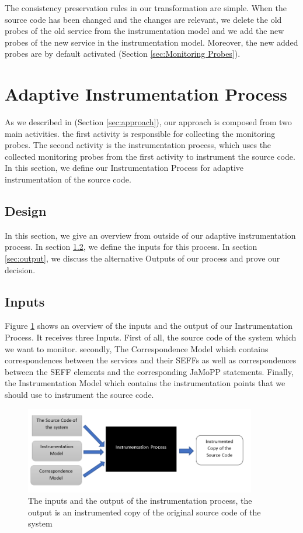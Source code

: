 The consistency preservation rules in our transformation are simple. When the source code has been changed and the changes are relevant, we delete the old probes of the old service from the instrumentation model and we add the new probes of the new service in the instrumentation model. Moreover, the new added probes are by default activated (Section \ref{sec:Monitoring Probes}). \\

\section{Adaptive Instrumentation Process}
\label{sec:Adaptive Instrumentation Process}
As we described in (Section \ref{sec:approach}), our approach is composed from two main activities. the first activity is responsible for collecting the monitoring probes. The second activity is the instrumentation process, which uses the collected monitoring probes from the first activity to instrument the source code. In this section, we define our Instrumentation Process for adaptive instrumentation of the source code.
 
\subsection{Design}
\label{sec:Design}
In this section, we give an overview from outside of our adaptive instrumentation process. In section \ref{sec:Inputs}, we define the inputs for this process. In section \ref{sec:output}, we discuss the alternative Outputs of our process and prove our decision. 
\subsection{Inputs}
\label{sec:Inputs}
Figure \ref{fig:approach_design} shows an overview of the inputs and the output of our Instrumentation Process. It receives three Inputs. First of all, the source code of the system which we want to monitor. secondly, The Correspondence Model which contains correspondences between the services and their SEFFs as well as correspondences between the SEFF elements and the corresponding JaMoPP statements. Finally, the Instrumentation Model which contains the instrumentation points that we should use to instrument the source code. 

\begin{figure}[h]
\centering
\includegraphics[width=0.9\textwidth]{figures/approach_design}
\caption{The inputs and the output of the instrumentation process, the output is an instrumented copy of the original source code of the system}
\label{fig:approach_design}
\end{figure}

